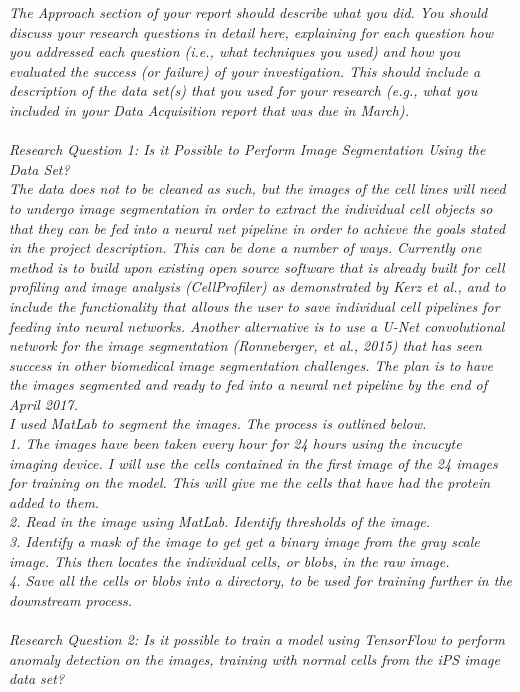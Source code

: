 \emph{The Approach section of your report should describe what you did. You should discuss your research questions in detail here, explaining for each question how you addressed each question (i.e., what techniques you used) and how you evaluated the success (or failure) of your investigation. This should include a description of the data set(s) that you used for your research (e.g., what you included in your Data Acquisition report that was due in March). \\ \\ 
Research Question 1: Is it Possible to Perform Image Segmentation Using the Data Set? \\ The data does not to be cleaned as such, but the images of the cell lines will need to undergo image segmentation in order to extract the individual cell objects so that they can be fed into a neural net pipeline in order to achieve the goals stated in the project description. This can be done a number of ways. Currently one method is to build upon existing open source software that is already built for cell profiling and image analysis (CellProfiler) as demonstrated by Kerz et al., and to include the functionality that allows the user to save individual cell pipelines for feeding into neural networks. Another alternative is to use a U-Net convolutional network for the image segmentation (Ronneberger, et al., 2015) that has seen success in other biomedical image segmentation challenges. The plan is to have the images segmented and ready to fed into a neural net pipeline by the end of April 2017. \\
I used MatLab to segment the images. The process is outlined below. \\
1. The images have been taken every hour for 24 hours using the incucyte imaging device. I will use the cells contained in the first image of the 24 images for training on the model. This will give me the cells that have had the protein added to them. \\
2. Read in the image using MatLab. Identify thresholds of the image. \\
3. Identify a mask of the image to get get a binary image from the gray scale image. This then locates the individual cells, or blobs, in the raw image. \\
4. Save all the cells or blobs into a directory, to be used for training further in the downstream process. \\ \\  
Research Question 2: Is it possible to train a model using TensorFlow to perform anomaly detection on the images, training with normal cells from the iPS image data set? \\ 
}
